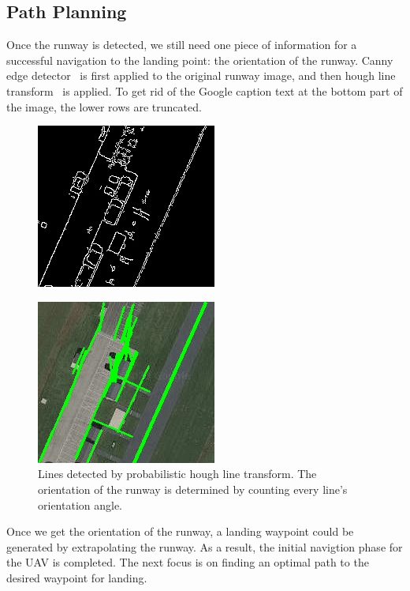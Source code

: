 \documentclass[10pt,twocolumn,letterpaper]{article}
\begin{document}
\subsection{Path Planning}
Once the runway is detected, we still need one piece of information for a successful navigation to the landing point: the orientation of the runway. Canny edge detector~\cite{Author4} is first applied to the original runway image, and then hough line transform~\cite{Author5} is applied. To get rid of the Google caption text at the bottom part of the image, the lower rows are truncated.
\begin{figure}[t]
\begin{center}
   \includegraphics[width=0.5\linewidth]{edge.jpg}
\end{center}
\label{fig:long}
\label{fig:onecol}
\end{figure}
\begin{figure}[t]
\begin{center}
   \includegraphics[width=0.5\linewidth]{hough_line_runway.jpg}
\end{center}
\caption{Lines detected by probabilistic hough line transform. The orientation of the runway is determined by counting every line's orientation angle.}
\label{fig:long}
\label{fig:onecol}
\end{figure}
Once we get the orientation of the runway, a landing waypoint could be generated by extrapolating the runway. As a result, the initial navigtion phase for the UAV is completed. The next focus is on finding an optimal path to the desired waypoint for landing. 
\end{document}
